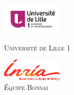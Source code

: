 
\begin{titlepage}

\begin{center}

\begin{minipage}[t]{0.48\textwidth}
  \begin{flushleft}
    \includegraphics [width=30mm]{images/logo-univ.png} \\[0.5cm]
    \begin{spacing}{1.5}
      \textsc{\large Université de Lille 1}
    \end{spacing}
  \end{flushleft}
\end{minipage}
\begin{minipage}[t]{0.48\textwidth}
  \begin{flushright}
    \includegraphics [width=30mm]{images/INRIA_logo.png} \\[0.5cm]
    \textsc{\large Équipe Bonsai}
  \end{flushright}
\end{minipage} \\[1.5cm]

%



\end{center}
\end{titlepage}
